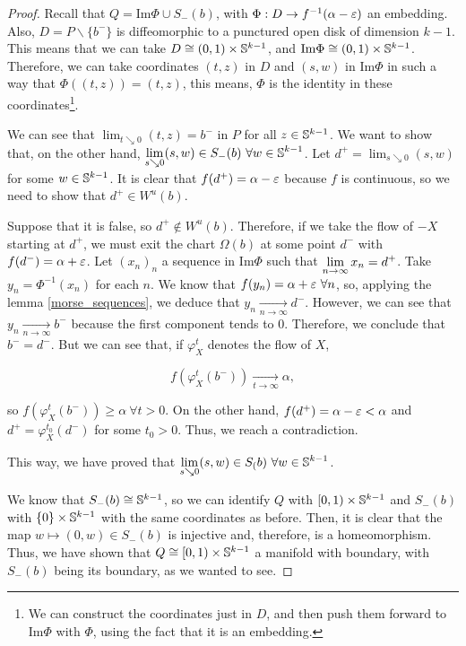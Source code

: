 \begin{proof}
Recall that $Q = \text{Im}\Phi \cup S_-(b)$, with $\Phi : D \rightarrow f^{-1}(\alpha-\varepsilon)$ an embedding. Also, $D = P \backslash \{b^-\}$ is diffeomorphic to a punctured open disk of dimension $k-1$. This means that we can take $D \cong (0,1) \times \mathbb{S}^{k-1}$, and $\text{Im} \Phi \cong (0,1) \times \mathbb{S}^{k-1}$. Therefore, we can take coordinates $(t,z)$ in $D$ and $(s,w)$ in $\text{Im} \Phi$ in such a way that $\Phi((t,z)) = (t,z)$, this means, $\Phi$ is the identity in these coordinates\footnote{We can construct the coordinates just in $D$, and then push them forward to $\text{Im}\Phi$ with $\Phi$, using the fact that it is an embedding.}.

We can see that $\displaystyle\lim_{t \searrow 0} (t,z) = b^-$ in $P$ for all $z \in \mathbb{S}^{k-1}$. We want to show that, on the other hand, $\displaystyle\lim_{s \searrow 0} (s,w) \in S_-(b) \ \forall w \in \con{S}^{k-1}$. Let $d^+ = \displaystyle\lim_{s \searrow 0} (s,w)$ for some $w \in \mathbb{S}^{k-1}$. It is clear that $f(d^+) = \alpha - \varepsilon$ because $f$ is continuous, so we need to show that $d^+ \in W^u(b)$.

Suppose that it is false, so $d^+ \notin W^u(b)$. Therefore, if we take the flow of $- X$ starting at $d^+$, we must exit the chart $\Omega(b)$ at some point $d^-$ with $f(d^-) = \alpha + \varepsilon$. Let $(x_n)_n$ a sequence in $\text{Im}\Phi$ such that $\displaystyle\lim_{n \rightarrow \infty} x_n = d^+$. Take $y_n = \Phi^{-1}(x_n)$ for each $n$. We know that $f(y_n) = \alpha + \varepsilon \ \forall n$, so, applying the lemma \ref{morse_sequences}, we deduce that $y_n \xrightarrow[n \rightarrow \infty]{} d^-$. However, we can see that $y_n \xrightarrow[n \rightarrow \infty]{} b^-$ because the first component tends to $0$. Therefore, we conclude that $b^- = d^-$. But we can see that, if $\varphi_X^t$ denotes the flow of $X$,

$$f(\varphi_X^t(b^-)) \xrightarrow[t \rightarrow \infty]{} \alpha ,$$

so $f(\varphi_X^t(b^-)) \geq \alpha \ \forall t > 0$. On the other hand, $f(d^+) = \alpha - \varepsilon < \alpha$ and $d^+ = \varphi_X^{t_0}(d^-)$ for some $t_0 > 0$. Thus, we reach a contradiction.

This way, we have proved that $\displaystyle\lim_{s \searrow 0} (s,w) \in S_(b) \ \forall w \in \con{S}^{k-1}$.

We know that $S_-(b) \cong \mathbb{S}^{k-1}$, so we can identify $Q$ with $[0,1) \times \mathbb{S}^{k-1}$ and $S_-(b)$ with $\{0\} \times \mathbb{S}^{k-1}$ with the same coordinates as before. Then, it is clear that the map $w \mapsto (0,w) \in S_-(b)$ is injective and, therefore, is a homeomorphism. Thus, we have shown that $Q \cong [0,1) \times \mathbb{S}^{k-1}$ a manifold with boundary, with $S_-(b)$ being its boundary, as we wanted to see. 
\end{proof}

